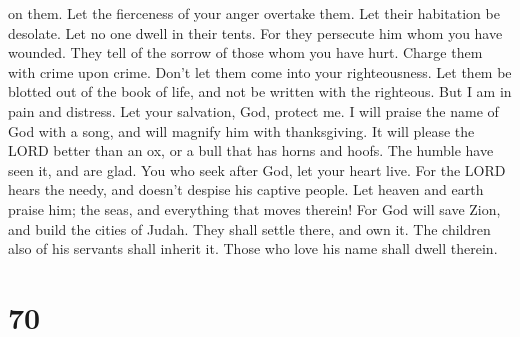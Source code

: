 on them. Let the fierceness of your anger overtake them. 
Let their habitation be desolate. Let no one dwell in their tents.
 For they persecute him whom you have wounded. They tell of
the sorrow of those whom you have hurt.  Charge them with
crime upon crime. Don't let them come into your righteousness.
 Let them be blotted out of the book of life, and not be
written with the righteous.  But I am in pain and distress.
Let your salvation, God, protect me.  I will praise the
name of God with a song, and will magnify him with thanksgiving.
 It will please the LORD better than an ox, or a bull that
has horns and hoofs.  The humble have seen it, and are
glad. You who seek after God, let your heart live.  For the
LORD hears the needy, and doesn't despise his captive people.
 Let heaven and earth praise him; the seas, and everything
that moves therein!  For God will save Zion, and build the
cities of Judah. They shall settle there, and own it.  The
children also of his servants shall inherit it. Those who love his name
shall dwell therein.

\hypertarget{section-69}{%
\section{70}\label{section-69}}

